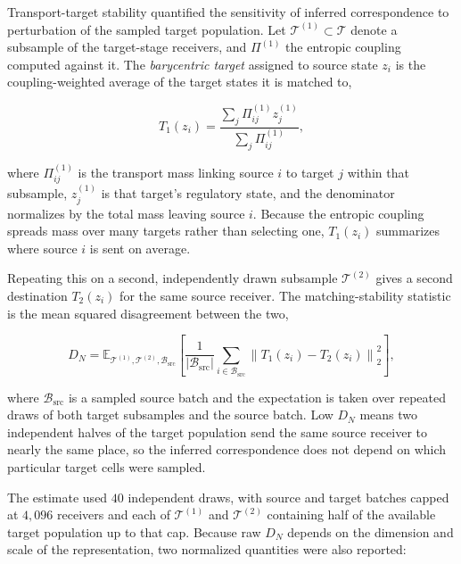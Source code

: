 Transport-target stability quantified the sensitivity of inferred
correspondence to perturbation of the sampled target population. Let
\(\mathcal{T}^{(1)}\subset\mathcal{T}\) denote a subsample of the target-stage
receivers, and \(\Pi^{(1)}\) the entropic coupling computed against it. The
\emph{barycentric target} assigned to source state \(z_i\) is the
coupling-weighted average of the target states it is matched to,

\begin{equation}
T_{1}(z_i)
=
\frac{
\sum_j \Pi_{ij}^{(1)}z_j^{(1)}
}{
\sum_j \Pi_{ij}^{(1)}
},
\label{eq:methods-barycentric-target}
\end{equation}

where \(\Pi_{ij}^{(1)}\) is the transport mass linking source \(i\) to target
\(j\) within that subsample, \(z_j^{(1)}\) is that target's regulatory state,
and the denominator normalizes by the total mass leaving source \(i\). Because
the entropic coupling spreads mass over many targets rather than selecting one,
\(T_1(z_i)\) summarizes where source \(i\) is sent on average.

Repeating this on a second, independently drawn subsample
\(\mathcal{T}^{(2)}\) gives a second destination \(T_2(z_i)\) for the same
source receiver. The matching-stability statistic is the mean squared
disagreement between the two,

\begin{equation}
D_N
=
\mathbb{E}_{\mathcal{T}^{(1)},\mathcal{T}^{(2)},\mathcal{B}_{\mathrm{src}}}
\left[
\frac{1}{
\left|\mathcal{B}_{\mathrm{src}}\right|
}
\sum_{i\in\mathcal{B}_{\mathrm{src}}}
\left\|
T_{1}(z_i)
-
T_{2}(z_i)
\right\|_2^2
\right],
\label{eq:methods-matching-stability}
\end{equation}

where \(\mathcal{B}_{\mathrm{src}}\) is a sampled source batch and the
expectation is taken over repeated draws of both target subsamples and the
source batch. Low \(D_N\) means two independent halves of the target population
send the same source receiver to nearly the same place, so the inferred
correspondence does not depend on which particular target cells were sampled.

The estimate used \(40\) independent draws, with source and target batches
capped at \(4{,}096\) receivers and each of \(\mathcal{T}^{(1)}\) and
\(\mathcal{T}^{(2)}\) containing half of the available target population up to
that cap. Because raw \(D_N\) depends on the
dimension and scale of the representation, two normalized quantities were also
reported:


